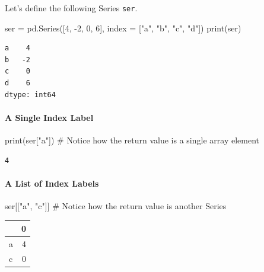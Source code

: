 \documentclass[
  letterpaper,
  DIV=11,
  numbers=noendperiod]{scrreprt}
\let\oldparagraph\paragraph
\renewcommand{\paragraph}[1]{\oldparagraph{#1}\mbox{}}
\newenvironment{Shaded}{\begin{snugshade}}{\end{snugshade}}
\newcommand{\BuiltInTok}[1]{\textcolor[rgb]{0.00,0.23,0.31}{#1}}
\newcommand{\CommentTok}[1]{\textcolor[rgb]{0.37,0.37,0.37}{#1}}
\newcommand{\DecValTok}[1]{\textcolor[rgb]{0.68,0.00,0.00}{#1}}
\newcommand{\NormalTok}[1]{\textcolor[rgb]{0.00,0.23,0.31}{#1}}
\newcommand{\OperatorTok}[1]{\textcolor[rgb]{0.37,0.37,0.37}{#1}}
\newcommand{\StringTok}[1]{\textcolor[rgb]{0.13,0.47,0.30}{#1}}
\begin{document}
Let's define the following Series \texttt{ser}.

\begin{Shaded}
\begin{Highlighting}[]
\NormalTok{ser }\OperatorTok{=}\NormalTok{ pd.Series([}\DecValTok{4}\NormalTok{, }\OperatorTok{{-}}\DecValTok{2}\NormalTok{, }\DecValTok{0}\NormalTok{, }\DecValTok{6}\NormalTok{], index }\OperatorTok{=}\NormalTok{ [}\StringTok{"a"}\NormalTok{, }\StringTok{"b"}\NormalTok{, }\StringTok{"c"}\NormalTok{, }\StringTok{"d"}\NormalTok{])}
\BuiltInTok{print}\NormalTok{(ser)}
\end{Highlighting}
\end{Shaded}

\begin{verbatim}
a    4
b   -2
c    0
d    6
dtype: int64
\end{verbatim}

\hypertarget{a-single-index-label}{%
\paragraph{A Single Index Label}\label{a-single-index-label}}

\begin{Shaded}
\begin{Highlighting}[]
\BuiltInTok{print}\NormalTok{(ser[}\StringTok{"a"}\NormalTok{]) }\CommentTok{\# Notice how the return value is a single array element}
\end{Highlighting}
\end{Shaded}

\begin{verbatim}
4
\end{verbatim}

\hypertarget{a-list-of-index-labels}{%
\paragraph{A List of Index Labels}\label{a-list-of-index-labels}}

\begin{Shaded}
\begin{Highlighting}[]
\NormalTok{ser[[}\StringTok{"a"}\NormalTok{, }\StringTok{"c"}\NormalTok{]] }\CommentTok{\# Notice how the return value is another Series}
\end{Highlighting}
\end{Shaded}

\begin{tabular}{lr}
\toprule
{} &  0 \\
\midrule
a &  4 \\
c &  0 \\
\bottomrule
\end{tabular}
\end{document}
